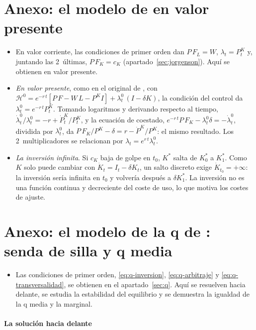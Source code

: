 \documentclass[11pt]{article}
\begin{document}
\section{Anexo: el modelo de  en valor presente}\label{anexo:jorgenson}

\begin{itemize}
\item En valor corriente, las condiciones de primer orden dan $P\,F_L=W$, $\lambda_t=P^K_t$ y, juntando las 2~últimas, $P\,F_K=c_K$ (apartado~\ref{sec:jorgenson}). Aquí se obtienen en valor presente.
\item \emph{En valor presente}, como en el original de , con $\mathcal{H}^0=e^{-r\,t}\left[P\,F-W\,L-P^K I\right]+\lambda^0_t\,(I-\delta K)$, la condición del control da $\lambda^0_t=e^{-r\,t}P^K_t$. Tomando logaritmos y derivando respecto al tiempo, $\dot\lambda^0_t/\lambda^0_t=-r+\dot P^K_t/P^K_t$, y la ecuación de coestado, $e^{-r\,t}P\,F_K-\lambda^0_t\delta=-\dot\lambda^0_t$, dividida por $\lambda^0_t$, da $P\,F_K/P^K-\delta=r-\dot P^K/P^K$: el mismo resultado. Los 2~multiplicadores se relacionan por $\lambda_t=e^{r\,t}\lambda^0_t$.
\item \emph{La inversión infinita}. Si $c_K$ baja de golpe en $t_0$, $K^*$ salta de $K^*_0$ a $K^*_1$. Como $K$ solo puede cambiar con $\dot K_t=I_t-\delta K_t$, un salto discreto exige $\dot K_{t_0}=+\infty$: la inversión sería infinita en $t_0$ y volvería después a $\delta K^*_1$. La inversión no es una función continua y decreciente del coste de uso, lo que motiva los costes de ajuste.
\end{itemize}

\section{Anexo: el modelo de la q de :\cortetitulo{} senda de silla y q media}\label{anexo:q}

\begin{itemize}
\item Las condiciones de primer orden, \eqref{eq:q-inversion}, \eqref{eq:q-arbitraje} y \eqref{eq:q-transversalidad}, se obtienen en el apartado~\ref{sec:q}. Aquí se resuelven hacia delante, se estudia la estabilidad del equilibrio y se demuestra la igualdad de la q media y la marginal.
\end{itemize}

\paragraph{La solución hacia delante}
\end{document}
